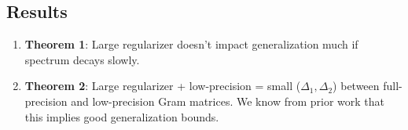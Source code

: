 \documentclass[12pt]{article}
\begin{document}
\subsection{Results}
\begin{enumerate}
	\item \textbf{Theorem 1}: Large regularizer doesn't impact generalization much if spectrum decays slowly.
	\item \textbf{Theorem 2}: Large regularizer + low-precision = small ($\Delta_1,\Delta_2$) between full-precision and low-precision Gram matrices.  We know from prior work that this implies good generalization bounds.
\end{enumerate}
\end{document}
